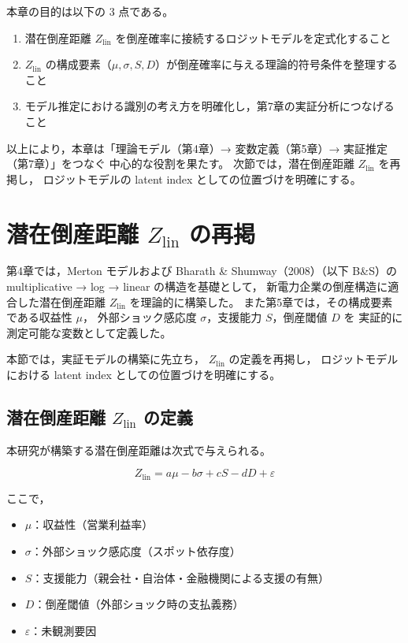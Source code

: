 本章の目的は以下の 3 点である。

\begin{enumerate}
    \item 潜在倒産距離 $Z_{\text{lin}}$ を倒産確率に接続するロジットモデルを定式化すること
    \item $Z_{\text{lin}}$ の構成要素（$\mu, \sigma, S, D$）が倒産確率に与える理論的符号条件を整理すること
    \item モデル推定における識別の考え方を明確化し，第7章の実証分析につなげること
\end{enumerate}

以上により，本章は「理論モデル（第4章）→ 変数定義（第5章）→ 実証推定（第7章）」をつなぐ
中心的な役割を果たす。
次節では，潜在倒産距離 $Z_{\text{lin}}$ を再掲し，
ロジットモデルの latent index としての位置づけを明確にする。


\section{潜在倒産距離 $Z_{\text{lin}}$ の再掲}

第4章では，Merton モデルおよび Bharath \& Shumway（2008）（以下 B\&S）の
multiplicative → log → linear の構造を基礎として，
新電力企業の倒産構造に適合した潜在倒産距離 $Z_{\text{lin}}$ を理論的に構築した。
また第5章では，その構成要素である収益性 $\mu$，
外部ショック感応度 $\sigma$，支援能力 $S$，倒産閾値 $D$ を
実証的に測定可能な変数として定義した。

本節では，実証モデルの構築に先立ち，
$Z_{\text{lin}}$ の定義を再掲し，
ロジットモデルにおける latent index としての位置づけを明確にする。

\subsection{潜在倒産距離 $Z_{\text{lin}}$ の定義}

本研究が構築する潜在倒産距離は次式で与えられる。



\[
Z_{\text{lin}}
= a\mu - b\sigma + cS - dD + \varepsilon
\]



ここで，

\begin{itemize}
    \item $\mu$：収益性（営業利益率）
    \item $\sigma$：外部ショック感応度（スポット依存度）
    \item $S$：支援能力（親会社・自治体・金融機関による支援の有無）
    \item $D$：倒産閾値（外部ショック時の支払義務）
    \item $\varepsilon$：未観測要因
\end{itemize}

